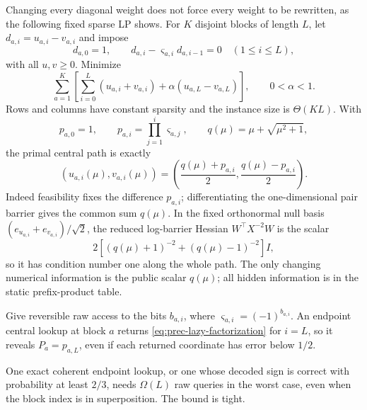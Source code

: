 Changing every diagonal weight does not force every weight to be rewritten,
as the following fixed sparse LP shows.  For $K$
disjoint
blocks of length $L$, let
$d_{a,i}=u_{a,i}-v_{a,i}$ and impose
\begin{equation}
 d_{a,0}=1,\qquad
 d_{a,i}-\varsigma_{a,i}d_{a,i-1}=0\quad(1\leq i\leq L),  \label{eq:prec-lazy-paths}
\end{equation}
with all $u,v\geq0$.  Minimize
\begin{equation}
 \sum_{a=1}^K\left[
  \sum_{i=0}^L(u_{a,i}+v_{a,i})
  +\alpha(u_{a,L}-v_{a,L})\right],\qquad 0<\alpha<1.       \label{eq:prec-lazy-objective}
\end{equation}
Rows and columns have constant sparsity and the instance size is
$\Theta(KL)$.  With
\begin{equation}
 p_{a,0}=1,\qquad p_{a,i}=\prod_{j=1}^i\varsigma_{a,j},\qquad
 q(\mu)=\mu+\sqrt{\mu^2+1},                              \label{eq:prec-lazy-prefix}
\end{equation}
the primal central path is exactly
\begin{equation}
 (u_{a,i}(\mu),v_{a,i}(\mu))
 =\left(\frac{q(\mu)+p_{a,i}}2,
         \frac{q(\mu)-p_{a,i}}2\right).                  \label{eq:prec-lazy-factorization}
\end{equation}
Indeed feasibility fixes the difference $p_{a,i}$; differentiating the
one-dimensional pair barrier gives the common sum $q(\mu)$.  In the fixed
orthonormal null basis
$(e_{u_{a,i}}+e_{v_{a,i}})/\sqrt2$, the reduced log-barrier Hessian
$W^\top X^{-2}W$ is the scalar
\[
 2[(q(\mu)+1)^{-2}+(q(\mu)-1)^{-2}]I,
\]
so it has condition number one along the whole path.  The only changing
numerical information is the public scalar $q(\mu)$; all hidden information
is in the static prefix-product table.

Give reversible raw access to the bits $b_{a,i}$, where
$\varsigma_{a,i}=(-1)^{b_{a,i}}$.  An endpoint central lookup at block $a$
returns \eqref{eq:prec-lazy-factorization} for $i=L$, so it reveals
$P_a=p_{a,L}$, even if each returned coordinate has error below $1/2$.

\begin{theorem}
\label{thm:prec-lazy-lookup}
One exact coherent endpoint lookup, or one whose decoded sign is correct with
probability at least $2/3$, needs $\Omega(L)$ raw queries in the worst case,
even when the block index is in superposition.  The bound is tight.
\end{theorem}


